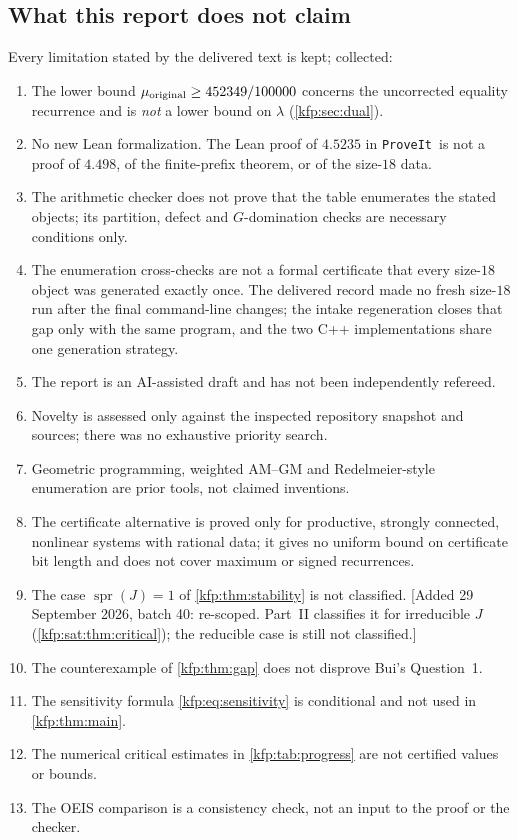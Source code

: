 \documentclass[11pt,a4paper]{article}
\theoremstyle{definition}
\theoremstyle{remark}
\newcommand{\spr}{\operatorname{spr}}
\newcommand{\repo}{\texttt{ProveIt}}
\begin{document}
\subsection{What this report does not claim}
Every limitation stated by the delivered text is kept; collected:
\begin{enumerate}[label=N\arabic*.,leftmargin=2.6em]
\item The lower bound $\mu_{\rm original}\geq452349/100000$ concerns the
 uncorrected equality recurrence and is \emph{not} a lower bound on
 $\lambda$ (\cref{kfp:sec:dual}).
\item No new Lean formalization. The Lean proof of $4.5235$ in \repo\ is not a
 proof of $4.498$, of the finite-prefix theorem, or of the size-$18$ data.
\item The arithmetic checker does not prove that the table enumerates the
 stated objects; its partition, defect and $G$-domination checks are
 necessary conditions only.
\item The enumeration cross-checks are not a formal certificate that every
 size-$18$ object was generated exactly once. The delivered record made no
 fresh size-$18$ run after the final command-line changes; the intake
 regeneration closes that gap only with the same program, and the two C++
 implementations share one generation strategy.
\item The report is an AI-assisted draft and has not been independently
 refereed.
\item Novelty is assessed only against the inspected repository snapshot and
 sources; there was no exhaustive priority search.
\item Geometric programming, weighted AM--GM and Redelmeier-style enumeration
 are prior tools, not claimed inventions.
\item The certificate alternative is proved only for productive, strongly
 connected, nonlinear systems with rational data; it gives no uniform bound
 on certificate bit length and does not cover maximum or signed recurrences.
\item The case $\spr(J)=1$ of \cref{kfp:thm:stability} is not classified.
 [Added 29 September 2026, batch 40: re-scoped. Part~II classifies it for
 irreducible $J$ (\cref{kfp:sat:thm:critical}); the reducible case is still
 not classified.]
\item The counterexample of \cref{kfp:thm:gap} does not disprove Bui's
 Question~1.
\item The sensitivity formula \eqref{kfp:eq:sensitivity} is conditional and
 not used in \cref{kfp:thm:main}.
\item The numerical critical estimates in \cref{kfp:tab:progress} are not
 certified values or bounds.
\item The OEIS comparison is a consistency check, not an input to the proof or
 the checker.
\end{enumerate}
\end{document}
